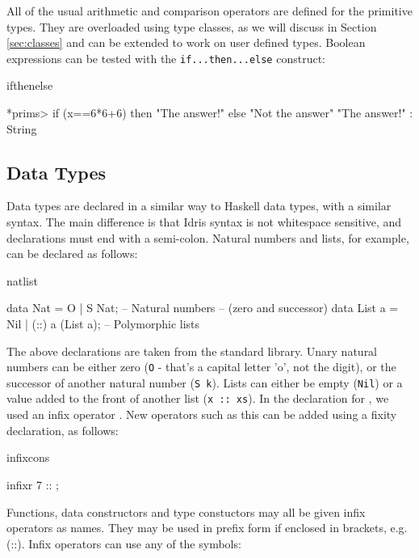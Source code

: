 All of the usual arithmetic and comparison operators are defined for the primitive
types. They are overloaded using type classes, as we will discuss in Section
\ref{sec:classes} and can be extended to work on user defined types.
Boolean expressions can be tested with the \texttt{if...then...else} construct:

\begin{SaveVerbatim}{ifthenelse}

*prims> if (x==6*6+6) then "The answer!" else "Not the answer"
"The answer!" : String

\end{SaveVerbatim}

\subsection{Data Types}

Data types are declared in a similar way to Haskell data types, with a similar
syntax. The main difference is that Idris syntax is not whitespace sensitive,
and declarations must end with a semi-colon. Natural numbers and lists, for 
example, can be declared as follows:

\begin{SaveVerbatim}{natlist}

data Nat    = O   | S Nat;           -- Natural numbers
                                     -- (zero and successor)
data List a = Nil | (::) a (List a); -- Polymorphic lists

\end{SaveVerbatim}

The above declarations are taken from the standard library. Unary natural
numbers can be either zero (\texttt{O} - that's a capital letter 'o', not the digit), or
the successor of another natural number (\texttt{S k}). 
Lists can either be empty (\texttt{Nil})
or a value added to the front of another list (\texttt{x :: xs}).
In the declaration for , we used an infix operator \tDC{::}. New operators
such as this can be added using a fixity declaration, as follows:

\begin{SaveVerbatim}{infixcons}

infixr 7 :: ;

\end{SaveVerbatim}

Functions, data constructors and type constuctors may all be given infix
operators as names. They may be used in prefix form if enclosed in brackets,
e.g. (::). Infix operators can use any of the symbols:

